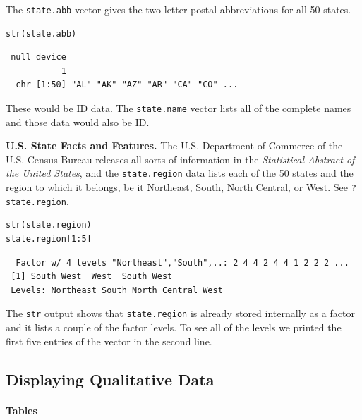 \documentclass[captions=tableheading]{scrbook}
\begin{document}
\begin{example}
The \texttt{state.abb}
vector gives the two letter postal abbreviations for all 50 states.


\begin{verbatim}
str(state.abb)
\end{verbatim}

\begin{verbatim}
 null device 
           1
  chr [1:50] "AL" "AK" "AZ" "AR" "CA" "CO" ...
\end{verbatim}

These would be ID data. The \texttt{state.name} vector lists all of the complete names and those data would also be ID.
\end{example}

\begin{example}
\textbf{U.S. State Facts and Features.} The U.S. Department of Commerce of the U.S. Census Bureau releases all sorts of information in the \emph{Statistical Abstract of the United States}, and the \texttt{state.region} data lists each of the 50 states and the region to which it belongs, be it Northeast, South, North Central, or West. See \texttt{?state.region}.


\begin{verbatim}
str(state.region)
state.region[1:5]
\end{verbatim}

\begin{verbatim}
  Factor w/ 4 levels "Northeast","South",..: 2 4 4 2 4 4 1 2 2 2 ...
 [1] South West  West  South West 
 Levels: Northeast South North Central West
\end{verbatim}

The \texttt{str} output shows that \texttt{state.region} is already stored internally as a factor and it lists a couple of the factor levels. To see all of the levels we printed the first five entries of the vector in the second line.
\end{example}
\subsection{Displaying Qualitative Data}
\label{sec-3-1-4}

\label{sub:Displaying-Qualitative-Data}

\paragraph*{Tables}
\label{par:Tables}
\end{document}

